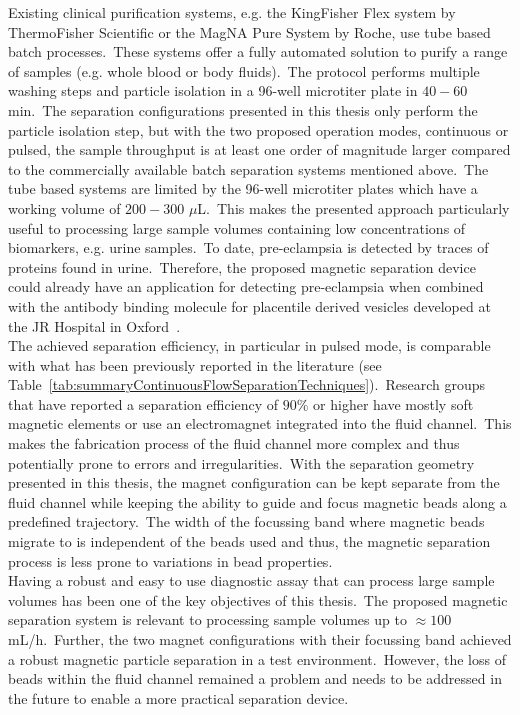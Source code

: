 Existing clinical purification systems, e.g. the KingFisher Flex system by ThermoFisher Scientific or the MagNA Pure System by Roche, use tube based batch processes.\ These systems offer a fully automated solution to purify a range of samples (e.g. whole blood or body fluids).\ The protocol performs multiple washing steps and particle isolation in a 96-well microtiter plate in $40-60$ min.\ The separation configurations presented in this thesis only perform the particle isolation step, but with the two proposed operation modes, continuous or pulsed, the sample throughput is at least one order of magnitude larger compared to the commercially available batch separation systems mentioned above.\ The tube based systems are limited by the 96-well microtiter plates which have a working volume of $200-300$ $\mu$L.\ This makes the presented approach particularly useful to processing large sample volumes containing low concentrations of biomarkers, e.g. urine samples.\ To date, pre-eclampsia is detected by traces of proteins found in urine.\ Therefore, the proposed magnetic separation device could already have an application for detecting pre-eclampsia when combined with the antibody binding molecule for placentile derived vesicles developed at the JR Hospital in Oxford~\cite{Dragovic2013}.\\
The achieved separation efficiency, in particular in pulsed mode, is comparable with what has been previously reported in the literature (see Table~\ref{tab:summaryContinuousFlowSeparationTechniques}).\ Research groups that have reported a separation efficiency of $90\%$ or higher have mostly soft magnetic elements or use an electromagnet integrated into the fluid channel.\ This makes the fabrication process of the fluid channel more complex and thus potentially prone to errors and irregularities.\ With the separation geometry presented in this thesis, the magnet configuration can be kept separate from the fluid channel while keeping the ability to guide and focus magnetic beads along a predefined trajectory.\ The width of the focussing band where magnetic beads migrate to is independent of the beads used and thus, the magnetic separation process is less prone to variations in bead properties.\\
Having a robust and easy to use diagnostic assay that can process large sample volumes has been one of the key objectives of this thesis.\ The proposed magnetic separation system is relevant to processing sample volumes up to $\approx 100$ mL/h.\ Further, the two magnet configurations with their focussing band achieved a robust magnetic particle separation in a test environment.\ However, the loss of beads within the fluid channel remained a problem and needs to be addressed in the future to enable a more practical separation device.\\
